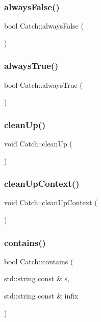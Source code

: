 \subsubsection{always\+False()}
{\footnotesize\ttfamily bool Catch\+::always\+False (\begin{DoxyParamCaption}{ }\end{DoxyParamCaption})\hspace{0.3cm}{\ttfamily [inline]}}

\mbox{\label{namespace_catch_a129be2186a2f6546206ec52c4bf2156f}} 
\subsubsection{always\+True()}
{\footnotesize\ttfamily bool Catch\+::always\+True (\begin{DoxyParamCaption}{ }\end{DoxyParamCaption})\hspace{0.3cm}{\ttfamily [inline]}}

\mbox{\label{namespace_catch_a0f78e9afdebc6d4512d18e76fbf54b8c}} 
\subsubsection{clean\+Up()}
{\footnotesize\ttfamily void Catch\+::clean\+Up (\begin{DoxyParamCaption}{ }\end{DoxyParamCaption})}

\mbox{\label{namespace_catch_ae50508f10ffc4ed873a31a4db4caea16}} 
\subsubsection{clean\+Up\+Context()}
{\footnotesize\ttfamily void Catch\+::clean\+Up\+Context (\begin{DoxyParamCaption}{ }\end{DoxyParamCaption})}

\mbox{\label{namespace_catch_aa52974b0e426e7e2fbd725a900e9c36e}} 
\subsubsection{contains()}
{\footnotesize\ttfamily bool Catch\+::contains (\begin{DoxyParamCaption}\item[{std\+::string const \&}]{s,  }\item[{std\+::string const \&}]{infix }\end{DoxyParamCaption})}


